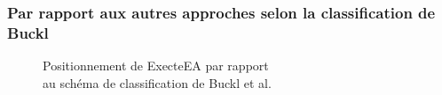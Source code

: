             \subsubsection{Par rapport aux autres approches selon la classification de Buckl}

\begin{figure}[!ht]
    
    \caption{Positionnement de ExecteEA par rapport\\au schéma de classification de
    Buckl et al. \protect\cite{buckl2009classifying}}
    \label{fig:positionBuckl}
\end{figure}




